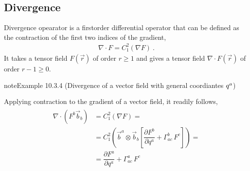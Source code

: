 \documentclass[letterpaper,10pt,english]{jupyterBook}
\begin{document}
\subsection{Divergence}
\label{\detokenize{ch/tensor-algebra-calculus/calculus-euclidean:divergence}}\label{\detokenize{ch/tensor-algebra-calculus/calculus-euclidean:tensor-calculus-differential-operators-divergence}}
\sphinxAtStartPar
Divergence opearator is a first\sphinxhyphen{}order differential operator that can be defined as the contraction of the first two indices of the gradient,
\begin{equation*}
\begin{split}\nabla \cdot F = C_{1}^{2}\left( \nabla F \right) \ .\end{split}
\end{equation*}
\sphinxAtStartPar
It takes a tensor field \(F(\vec{r})\) of order \(r \ge 1\) and gives a tensor field \(\nabla \cdot F(\vec{r})\) of order \(r-1 \ge 0\).
\label{ch/tensor-algebra-calculus/calculus-euclidean:example-7}
\begin{sphinxadmonition}{note}{Example 10.3.4 (Divergence of a vector field \sphinxhyphen{} with general coordiantes \protect\(q^{a}\protect\))}



\sphinxAtStartPar
Applying contraction to the gradient of a vector field, it readily follows,
\begin{equation*}
\begin{split}\begin{aligned}
  \nabla \cdot \left( F^b \vec{b}_b \right)
  & = C_{1}^{2} \left( \nabla F \right) = \\
  & = C_1^2 \left( \vec{b}^a \otimes \vec{b}_b \left[ \dfrac{\partial F^b}{\partial q^a} + \Gamma_{ac}^b \, F^c \right] \right) = \\
  & = \dfrac{\partial F^a}{\partial q^a} + \Gamma_{ac}^a \, F^c
\end{aligned}\end{split}
\end{equation*}\end{sphinxadmonition}
\label{ch/tensor-algebra-calculus/calculus-euclidean:example-8}
\end{document}
